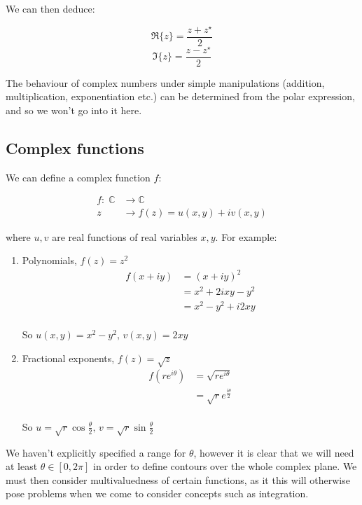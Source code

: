 \documentclass{../../physics_notes}
\begin{document}
We can then deduce:

\begin{equation}
\Re\{z\} = \frac{z + z^\star}{2} 
\end{equation}
\begin{equation}
\Im\{z\} = \frac{z - z^\star}{2}
\end{equation}

The behaviour of complex numbers under simple manipulations (addition, multiplication, exponentiation etc.) can be determined from the polar expression, and so we won't go into it here. 

\subsection{Complex functions}

We can define a complex function $f$:

\begin{align*}
f: \; \mathbb{C} &\rightarrow \mathbb{C} \\
z &\rightarrow f(z) = u(x, y) + iv(x, y)
\end{align*}

where $u, v$ are real functions of real variables $x, y$. For example:

\begin{enumerate}
\item{Polynomials, $f(z) = z^2$ \begin{align*} f(x + iy) &= (x + iy)^2 \\ &= x^2 + 2ixy - y^2 \\ &= x^2 - y^2 + i2xy\end{align*} \\ So $u(x, y) = x^2 - y^2, \, v(x, y) = 2xy$}
\item{Fractional exponents, $f(z) = \sqrt{z}$ \begin{align*} f(re^{i\theta}) &= \sqrt{re^{i\theta}} \\ &= \sqrt{r} e^{\frac{i\theta}{2}}\end{align*} \\ So $u = \sqrt{r}\cos{\frac{\theta}{2}}, \, v = \sqrt{r}\sin{\frac{\theta}{2}}$}
\end{enumerate}

We haven't explicitly specified a range for $\theta$, however it is clear that we will need at least $\theta \in \left[0, 2\pi\right]$ in order to define contours over the whole complex plane. We must then consider multivaluedness of certain functions, as it this will otherwise pose problems when we come to consider concepts such as integration. 
\end{document}
